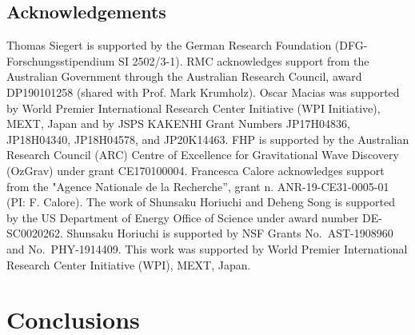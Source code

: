 \documentclass[doublespace,nopageskip]{VTthesis} %
\begin{document}



%




\section*{Acknowledgements}
%
Thomas Siegert is supported by the German Research Foundation (DFG-Forschungsstipendium SI 2502/3-1).
%
RMC acknowledges 
support from the Australian Government through the Australian Research Council, award
DP190101258 (shared with Prof. Mark Krumholz).
%
Oscar Macias was supported by World Premier International Research Center Initiative (WPI Initiative), MEXT, Japan and by JSPS KAKENHI Grant Numbers JP17H04836, JP18H04340, JP18H04578, and JP20K14463.
% 
FHP is supported by the Australian Research  Council  (ARC)  Centre  of  Excellence for  Gravitational  Wave  Discovery (OzGrav)  under grant CE170100004.
%
Francesca Calore acknowledges 
support from the "Agence Nationale de la Recherche”, grant n. ANR-19-CE31-0005-01 (PI: F. Calore).
%
The work of Shunsaku Horiuchi and Deheng Song is supported by the US Department of Energy Office of Science under award number DE-SC0020262.
%
Shunsaku Horiuchi is supported by NSF Grants No.~AST-1908960 and No.~PHY-1914409. This work was supported by World Premier International Research Center Initiative (WPI), MEXT, Japan. 


\chapter{Conclusions} \label{ch:summary}
\end{document}
